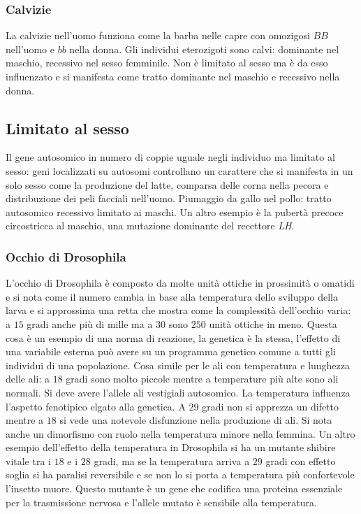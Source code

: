 \subsubsection{Calvizie}
La calvizie  nell'uomo funziona come la barba nelle capre con omozigosi $BB$ nell'uomo e $bb$ nella donna. Gli individui eterozigoti sono calvi: dominante nel maschio, recessivo nel
sesso femminile. Non \`e limitato al sesso ma \`e da esso influenzato e si manifesta come tratto dominante nel maschio e recessivo nella donna.
\subsection{Limitato al sesso}
Il gene autosomico in numero di coppie uguale negli individuo ma limitato al sesso: geni localizzati su autosomi controllano un carattere che si manifesta in un solo sesso come la
produzione del latte, comparsa delle corna nella pecora e distribuzione dei peli facciali nell'uomo. Piumaggio da gallo nel pollo: tratto autosomico recessivo limitato ai maschi. Un
altro esempio \`e la pubert\`a precoce circostricca al maschio, una mutazione dominante del recettore \emph{LH}. 
\subsubsection{Occhio di Drosophila}
L'occhio di Drosophila \`e composto da molte unit\`a ottiche in prossimit\`a o omatidi e si nota come il numero cambia in base alla temperatura dello sviluppo della larva e si 
approssima una retta che mostra come la complessit\`a dell'occhio varia: a $15$ gradi anche pi\`u di mille ma a $30$ sono $250$ unit\`a ottiche in meno. Questa cosa \`e un esempio di 
una norma di reazione, la genetica \`e la stessa, l'effetto di una variabile esterna pu\`o avere su un programma genetico comune a tutti gli individui di una popolazione. Cosa
simile per le ali con temperatura e lunghezza delle ali: a $18$ gradi sono molto piccole mentre a temperature pi\`u alte sono ali normali. Si deve avere l'allele ali vestigiali 
autosomico. La temperatura influenza l'aspetto fenotipico elgato alla genetica. A $29$ gradi non si apprezza un difetto mentre a $18$ si vede una notevole disfunzione nella produzione di
ali. Si nota anche un dimorfismo con ruolo nella temperatura minore nella femmina. Un altro esempio dell'effetto della temperatura in Drosophila si ha un mutante shibire vitale 
tra i $18$ e i $28$ gradi, ma se la temperatura arriva a $29$ gradi con effetto soglia si ha paralisi reversibile e se non lo si porta a temperatura pi\`u confortevole l'insetto muore. 
Questo mutante \`e un gene che codifica una proteina essenziale per la trasmissione nervosa e l'allele mutato \`e sensibile alla temperatura. 
